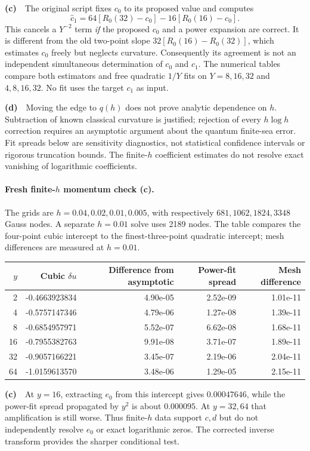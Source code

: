 \documentclass[11pt,a4paper]{article}
\newcommand{\Lc}{\textbf{(c)}\ }
\newcommand{\Ld}{\textbf{(d)}\ }
\begin{document}
\Lc\ The original script fixes $c_0$ to its proposed value and computes
\begin{equation}
 \widehat c_1=64[R_0(32)-c_0]-16[R_0(16)-c_0].
 \label{eq:fixedfit}
\end{equation}
This cancels a $Y^{-2}$ term \emph{if} the proposed $c_0$ and a power expansion
are correct. It is different from the old two-point slope
$32[R_0(16)-R_0(32)]$, which estimates $c_0$ freely but neglects curvature.
Consequently its agreement is not an independent simultaneous determination
of $c_0$ and $c_1$. The numerical tables compare both estimators and free
quadratic $1/Y$ fits on $Y=8,16,32$ and $4,8,16,32$.
No fit uses the target $c_1$ as input.

\Ld\ Moving the edge to $q(h)$ does not prove analytic dependence on $h$.
Subtraction of known classical curvature is justified; rejection of every
$h\log h$ correction requires an asymptotic argument about the quantum
finite-sea error. Fit spreads below are sensitivity diagnostics, not
statistical confidence intervals or rigorous truncation bounds. The finite-$h$
coefficient estimates do not resolve exact vanishing of logarithmic coefficients.

\paragraph{Fresh finite-$h$ momentum check (c).}
The grids are $h=0.04,0.02,0.01,0.005$, with respectively
$681,1062,1824,3348$ Gauss nodes. A separate $h=0.01$ solve uses 2189 nodes.
The table compares the four-point cubic intercept to the finest-three-point
quadratic intercept; mesh differences are measured at $h=0.01$.
\begin{center}\small
\begin{tabular}{rrrrr}\toprule
$y$ & Cubic $\delta u$ & Difference from asymptotic & Power-fit spread & Mesh difference\\\midrule
2 & -0.4663923834 & 4.90e-05 & 2.52e-09 & 1.01e-11\\
4 & -0.5757147346 & 4.79e-06 & 1.27e-08 & 1.39e-11\\
8 & -0.6854957971 & 5.52e-07 & 6.62e-08 & 1.68e-11\\
16 & -0.7955382763 & 9.91e-08 & 3.71e-07 & 1.89e-11\\
32 & -0.9057166221 & 3.45e-07 & 2.19e-06 & 2.04e-11\\
64 & -1.0159613570 & 3.48e-06 & 1.29e-05 & 2.15e-11\\
\bottomrule\end{tabular}\end{center}
\Lc\ At $y=16$, extracting $e_0$ from this intercept gives $0.00047646$,
while the power-fit spread propagated by $y^2$ is about $0.000095$.
At $y=32,64$ that amplification is still worse. Thus finite-$h$ data support
$c,d$ but do not independently resolve $e_0$ or exact logarithmic zeros.
The corrected inverse transform provides the sharper conditional test.
\end{document}
